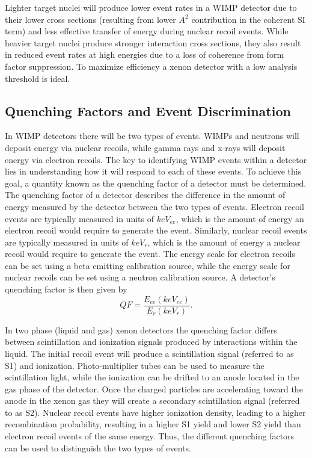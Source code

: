 \documentclass[a4paper,12pt]{article}
\begin{document}
Lighter target nuclei will produce lower event rates in a WIMP detector due to their lower cross sections (resulting from lower $A^2$ contribution in the coherent SI term) and less effective transfer of energy during nuclear recoil events. While heavier target nuclei produce stronger interaction cross sections, they also result in reduced event rates at high energies due to a loss of coherence from form factor suppression.  To maximize efficiency a xenon detector with a low analysis threshold is ideal.

\subsection{Quenching Factors and Event Discrimination}
In WIMP detectors there will be two types of events.  WIMPs and neutrons will deposit energy via nuclear recoils, while gamma rays and x-rays will deposit energy via electron recoils.  The key to identifying WIMP events within a detector lies in understanding how it will respond to each of these events.  To achieve this goal, a quantity known as the quenching factor of a detector must be determined.  The quenching factor of a detector describes the difference in the amount of energy measured by the detector between the two types of events.  Electron recoil events are typically measured in units of $keV_{ee}$, which is the amount of energy an electron recoil would require to generate the event.  Similarly, nuclear recoil events are typically measured in units of $keV_r$, which is the amount of energy a nuclear recoil would require to generate the event.  The energy scale for electron recoils can be set using a beta emitting calibration source, while the energy scale for nuclear recoils can be set using a neutron calibration source.  A detector's quenching factor is then given by
\[QF=\frac{E_{ee}(keV_{ee})}{E_r(keV_{r})}.\]

In two phase (liquid and gas) xenon detectors the quenching factor differs between scintillation and ionization signals produced by interactions within the liquid.  The initial recoil event will produce a scintillation signal (referred to as S1) and ionization.  Photo-multiplier tubes can be used to measure the scintillation light, while the ionization can be drifted to an anode located in the gas phase of the detector.  Once the charged particles are accelerating toward the anode in the xenon gas they will create a secondary scintillation signal (referred to as S2).  Nuclear recoil events have higher ionization density, leading to a higher recombination probability, resulting in a higher S1 yield and lower S2 yield than electron recoil events of the same energy. Thus, the different quenching factors can be used to distinguish the two types of events.
\end{document}
